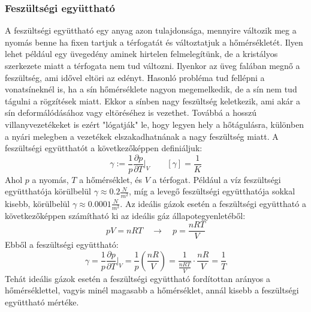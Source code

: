 \documentclass[../main.tex]{subfiles}
\begin{document}
\subsubsection*{Feszültségi együttható}
A feszültségi együttható egy anyag azon tulajdonsága, mennyire változik meg a nyomás benne ha fixen tartjuk a térfogatát és változtatjuk a hőmérsékletét.
Ilyen lehet például egy üvegedény aminek hirtelen felmelegítünk, de a kristályos szerkezete miatt a térfogata nem tud változni. Ilyenkor az üveg falában megnő a feszültség, ami idővel eltöri az edényt.
Hasonló probléma tud fellépni a vonatsíneknél is, ha a sín hőmérséklete nagyon megemelkedik, de a sín nem tud tágulni a rögzítések miatt. Ekkor a sínben nagy feszültség keletkezik, ami akár a sín deformálódásához vagy eltöréséhez is vezethet.
Továbbá a hosszú villanyvezetékeket is ezért "lógatják" le, hogy legyen hely a hőtágulásra, különben a nyári melegben a vezetékek elszakadhatnának a nagy feszültség miatt. 
A feszültségi együtthatót a következőképpen definiáljuk:
\begin{equation}
    \gamma := \frac{1}{p} \frac{\partial p}{\partial T}\bigg|_{V} \quad \quad \left[\gamma\right] = \frac{1}{K}
\end{equation}
Ahol $p$ a nyomás, $T$ a hőmérséklet, és $V$ a térfogat. Például a víz feszültségi együtthatója körülbelül $\gamma \approx 0.2 \frac{N}{m^2}$, míg a levegő feszültségi együtthatója sokkal kisebb, körülbelül $\gamma \approx 0.0001 \frac{N}{m^2}$.
Az ideális gázok esetén a feszültségi együttható a következőképpen számítható ki az ideális gáz állapotegyenletéből:
\begin{equation}
    pV = nRT \quad \rightarrow \quad p = \frac{nRT}{V}
\end{equation}
Ebből a feszültségi együttható:
\begin{equation}
    \gamma = \frac{1}{p} \frac{\partial p}{\partial T}\bigg|_{V} = \frac{1}{p} \left(\frac{nR}{V}\right) = \frac{1}{\frac{nRT}{V}} \cdot \frac{nR}{V} = \frac{1}{T}
\end{equation}
Tehát ideális gázok esetén a feszültségi együttható fordítottan arányos a hőmérséklettel, vagyis minél magasabb a hőmérséklet, annál kisebb a feszültségi együttható mértéke.
\end{document}
